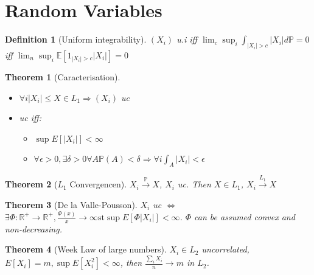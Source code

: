 \documentclass{article}
\newtheorem{theorem}{Theorem}
\newtheorem{definition}{Definition}
\begin{document}
\section{Random Variables}
\begin{definition}[Uniform integrability]
  $(X_i)$ u.i iff $\lim_c \sup_i \int_{|X_i| > c} |X_i|d\mathbb P = 0$
  iff $\lim_n \sup_i \mathbb E[1_{|X_i| > c}|X_i|]  = 0$
\end{definition}
\begin{theorem}[Caracterisation]
  \begin{itemize}
  \item $\forall i |X_i| \le X \in L_1 \Rightarrow (X_i)$ uc
  \item uc iff:
    \begin{itemize}
    \item $\sup E[|X_i|] < \infty$
    \item $\forall \epsilon > 0, \exists \delta > 0 \forall A \mathbb P(A) < \delta \Rightarrow  \forall i \int_A |X_i| < \epsilon$
    \end{itemize}
  \end{itemize}
\end{theorem}
\begin{theorem}[$L_1$ Convergencen]
  $X_i \overset{\mathbb P}{\rightarrow} X$, $X_i$ uc. Then $X \in L_1$, $X_i \overset{L_1}{\rightarrow} X$
  
\end{theorem}
\begin{theorem}[De la Valle-Pousson]
  $X_i$ uc $\iff$ $\exists \Phi: \mathbb R^+ \rightarrow \mathbb R^+,\frac{\Phi(x)}{x}\rightarrow \infty \text{st} \sup E[\Phi |X_i|] < \infty$.
  $\Phi$ can be assumed convex and non-decreasing.
\end{theorem}
\begin{theorem}[Week Law of large numbers]
  $X_i \in L_2$ uncorrelated, $E[X_i] = m, \sup E[X_i^2] < \infty$, then $\frac{\sum_i X_i}{n} \rightarrow m$ in $L_2$.
\end{theorem}
\end{document}
